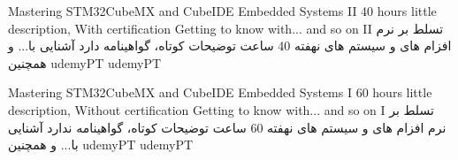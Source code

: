 
\professionalTrainingCI
{Mastering STM32CubeMX and CubeIDE Embedded Systems II}
{40 hours}
{little description, With certification}
{Getting to know with... and so on II}
{تسلط بر نرم افزام های  و  سیستم های نهفته }
{40 ساعت}
{توضیحات کوتاه، گواهینامه دارد}
{آشنایی با... و همچنین }
{udemyPT}
\professionalTrainingCII
{}
{}
{}
{udemyPT}

\professionalTrainingCI
{Mastering STM32CubeMX and CubeIDE Embedded Systems I}
{60 hours}
{little description, Without certification}
{Getting to know with... and so on I}
{تسلط بر نرم افزام های  و  سیستم های نهفته }
{60 ساعت}
{توضیحات کوتاه، گواهینامه ندارد}
{آشنایی با... و همچنین }
{udemyPT}
\professionalTrainingCII
{}
{}
{}
{udemyPT}

